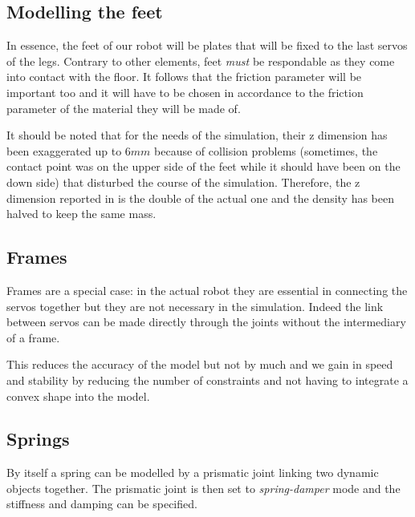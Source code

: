 \subsection{Modelling the feet}
In essence, the feet of our robot will be plates that will be fixed to the last servos of the legs. Contrary to other elements, feet \emph{must} be respondable as they come into contact with the floor. It follows that the friction parameter will be important too and it will have to be chosen in accordance to the friction parameter of the material they will be made of.

It should be noted that for the needs of the simulation, their z dimension has been exaggerated up to $6mm$ because of collision problems (sometimes, the contact point was on the upper side of the feet while it should have been on the down side) that disturbed the course of the simulation. Therefore, the z dimension reported in  is the double of the actual one and the density has been halved to keep the same mass.

\subsection{Frames}
Frames are a special case: in the actual robot they are essential in connecting the servos together but they are not necessary in the simulation. Indeed the link between servos can be made directly through the joints without the intermediary of a frame. 

This reduces the accuracy of the model but not by much and we gain in speed and stability by reducing the number of constraints and not having to integrate a convex shape into the model.

\subsection{Springs}
By itself a spring can be modelled by a prismatic joint linking two dynamic objects together. The prismatic joint is then set to \emph{spring-damper} mode and the stiffness and damping can be specified.

